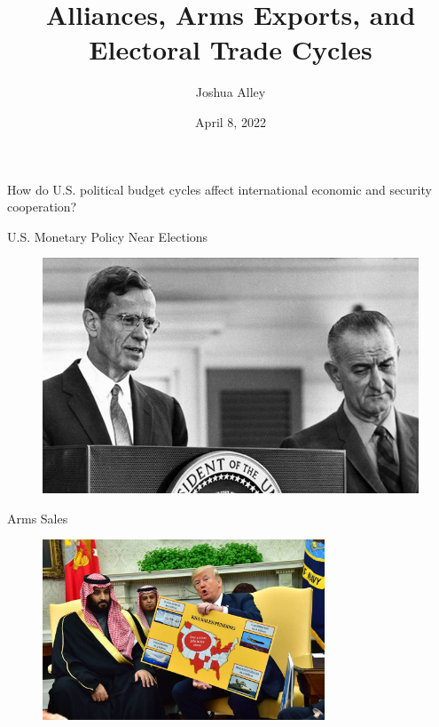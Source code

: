 \documentclass[12pt]{beamer}
\title{Alliances, Arms Exports, and Electoral Trade Cycles}
\date{April 8, 2022}
\author{Joshua Alley}
\institute{Democratic Statecraft Lab, University of Virginia}
\begin{document}
 \maketitle



 \begin{frame}[standout]

How do U.S. political budget cycles affect international economic and security cooperation? 


 \end{frame}
 

\begin{frame}{U.S. Monetary Policy Near Elections}

\pause 
\begin{figure}[htbp]
		\includegraphics[height=0.75\textheight]{lbj-fed.jpg}
\end{figure}

\end{frame}
 

\begin{frame}{Arms Sales}

\begin{figure}[htbp]
		\includegraphics[width=0.75\textwidth]{trump-sales.jpg}
\end{figure}

\end{frame}
 
\end{document}
